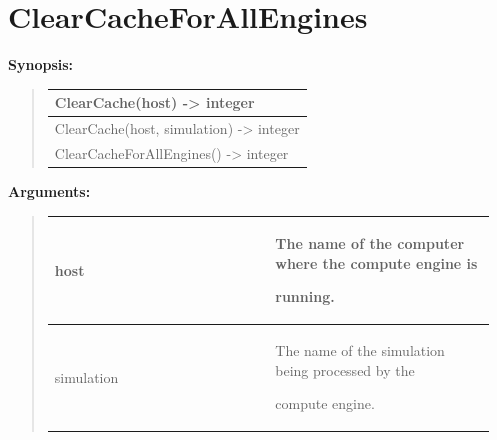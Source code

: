 \documentclass[letterpaper,10pt,english]{sphinxmanual}
\begin{document}
\section{ClearCacheForAllEngines}
\label{functions:clearcacheforallengines}
\begin{DUlineblock}{0em}
\item[] \textbf{Synopsis:}
\end{DUlineblock}
\begin{quote}

\begin{tabulary}{\linewidth}{|L|}
\hline

ClearCache(host) -\textgreater{} integer
\\
\hline
ClearCache(host, simulation) -\textgreater{} integer
\\
\hline
ClearCacheForAllEngines() -\textgreater{} integer
\\
\hline\end{tabulary}

\end{quote}

\begin{DUlineblock}{0em}
\item[] 
\item[] \textbf{Arguments:}
\end{DUlineblock}
\begin{quote}

\begin{tabular}{|p{0.475\linewidth}|p{0.475\linewidth}|}
\hline

host
 & 
\begin{DUlineblock}{0em}
\item[] The name of the computer where the compute engine is
\item[] running.
\end{DUlineblock}
\\
\hline
simulation
 & 
\begin{DUlineblock}{0em}
\item[] The name of the simulation being processed by the
\item[] compute engine.
\end{DUlineblock}
\\
\hline\end{tabular}

\end{quote}
\end{document}
